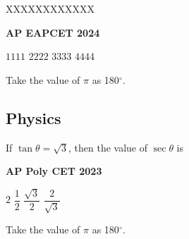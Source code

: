 \documentclass[11pt,paper=a4,answers]{exam}
\begin{document}
\begin{multicols}{2}
\begin{questions}
\question
XXXXXXXXXXXX
\begin{flushright}
\small\textbf{AP EAPCET 2024}
\end{flushright}
\begin{choices}
  \choice $1111$
  \choice $2222$ 
  \choice $3333$ 
  \choice $4444$
\end{choices}


\end{questions}
\end{multicols}

\begin{center}
  \Large{Take the value of $\pi$ as 180${^\circ}$.}
\end{center}

\newpage



\subsection*{Physics}
\begin{multicols}{2}
\begin{questions}
\question
If $\tan  \theta = \sqrt{3}$, then the value of $\sec \theta$ is
\begin{flushright}
\small\textbf{AP Poly CET 2023}
\end{flushright}


\begin{choices}
\choice $\displaystyle 2$ 
\choice $\displaystyle \dfrac{1}{2}$ 
\choice $\displaystyle \dfrac{\sqrt{3}}{2}$ 
\choice $\displaystyle \dfrac{2}{\sqrt{3}}$  
\end{choices}
\end{questions}

\end{multicols}

\begin{center}
\Large{Take the value of $\pi$ as 180${^\circ}$.}
\end{center}

\newpage
\end{document}
